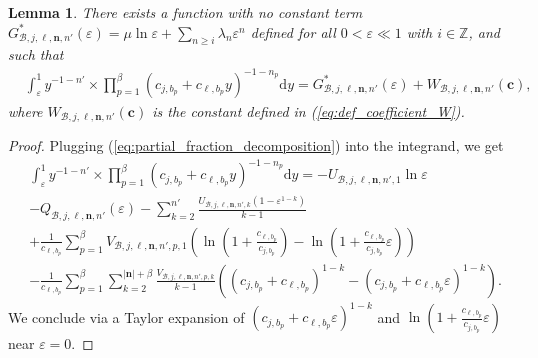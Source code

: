 \documentclass[a4paper]{amsart}
\newtheorem{lemma}[theorem]{Lemma}
\theoremstyle{remark}
\theoremstyle{definition}
\newcommand{\dd}{\mathrm{d}}
\begin{document}
\begin{lemma}
\label{lem:integral_computations_epsilon_1}
There exists a function with no constant term $G^*_{\mathcal{B},j,\ell,\mathbf{n},n'}(\varepsilon)=\mu \ln \varepsilon + \sum_{n \geq i} \lambda_n \varepsilon^n$ defined for all $0 < \varepsilon \ll 1$ with $i \in \mathbb{Z}$, and such that
\begin{align*}
    & \int_{\varepsilon}^1 y^{-1-n'} \times \prod_{p=1}^{\beta} \left( c_{j,b_p}+c_{\ell,b_p} y \right)^{-1-n_p} \dd y = G^*_{\mathcal{B},j,\ell,\mathbf{n},n'}(\varepsilon) + W_{\mathcal{B},j,\ell,\mathbf{n},n'}(\mathbf{c}),
\end{align*}
where $W_{\mathcal{B},j,\ell,\mathbf{n},n'}(\mathbf{c})$ is the constant defined in (\ref{eq:def_coefficient_W}).
\end{lemma}

\begin{proof}
Plugging (\ref{eq:partial_fraction_decomposition}) into the integrand, we get
\begin{align*}
    & \int_{\varepsilon}^1 y^{-1-n'} \times \prod_{p=1}^{\beta} \left( c_{j,b_p}+c_{\ell,b_p} y \right)^{-1-n_p} \dd y = - U_{\mathcal{B},j,\ell,\mathbf{n},n',1} \ln \varepsilon \\
    & - Q_{\mathcal{B},j,\ell,\mathbf{n},n'}(\varepsilon)-\sum_{k=2}^{n'} \frac{U_{\mathcal{B},j,\ell,\mathbf{n},n',k}(1-\varepsilon^{1-k})}{k-1} \\
    & + \frac{1}{c_{\ell,b_p}}\sum_{p=1}^{\beta} V_{\mathcal{B},j,\ell,\mathbf{n},n',p,1} \left( \ln \left( 1+\frac{c_{\ell,b_p}}{c_{j,b_p}}\right) - \ln \left( 1+\frac{c_{\ell,b_p}}{c_{j,b_p}} \varepsilon \right) \right) \\
    & - \frac{1}{c_{\ell,b_p}} \sum_{p=1}^{\beta} \sum_{k=2}^{|\mathbf{n}|+\beta} \frac{V_{\mathcal{B},j,\ell,\mathbf{n},n',p,k}}{k-1} \left( (c_{j,b_p}+ c_{\ell,b_p})^{1-k} - (c_{j,b_p}+ c_{\ell,b_p} \varepsilon)^{1-k} \right).
\end{align*}
We conclude via a Taylor expansion of $(c_{j,b_p}+ c_{\ell,b_p} \varepsilon)^{1-k}$ and $\ln \left( 1+\frac{c_{\ell,b_p}}{c_{j,b_p}} \varepsilon \right)$ near $\varepsilon=0$.
\end{proof}



\end{document}
